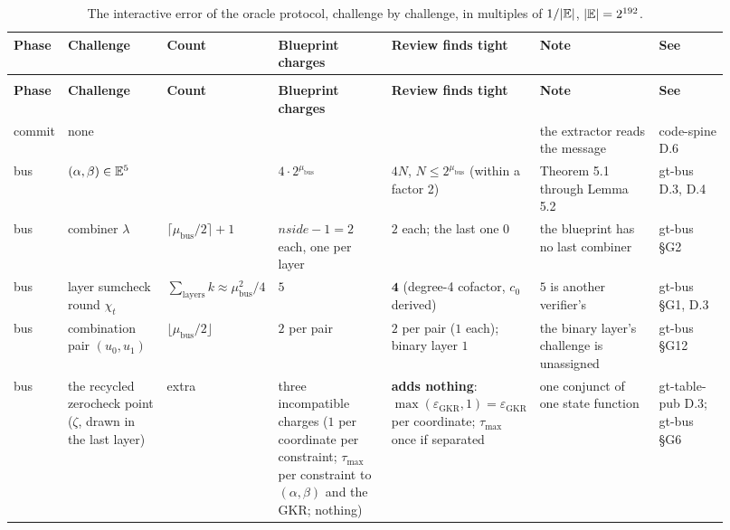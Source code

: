 \begin{landscape}
\begingroup\footnotesize\setlength{\tabcolsep}{3pt}\renewcommand{\arraystretch}{1.2}
\begin{longtable}{@{}>{\raggedright\arraybackslash}p{0.075\linewidth}>{\raggedright\arraybackslash}p{0.14\linewidth}>{\raggedright\arraybackslash}p{0.1\linewidth}>{\raggedright\arraybackslash}p{0.16\linewidth}>{\raggedright\arraybackslash}p{0.18\linewidth}>{\raggedright\arraybackslash}p{0.17\linewidth}>{\raggedright\arraybackslash}p{0.1\linewidth}@{}}
\caption{The interactive error of the oracle protocol, challenge by challenge, in multiples of $1/\lvert \mathbb{E}\rvert$, $\lvert \mathbb{E}\rvert = 2^{192}$.}\label{tab:obl-error-interactive}\\
\toprule
\textbf{Phase} & \textbf{Challenge} & \textbf{Count} & \textbf{Blueprint charges} & \textbf{Review finds tight} & \textbf{Note} & \textbf{See} \\
\midrule
\endfirsthead
\multicolumn{7}{@{}l}{\small\emph{(continued)}}\\
\toprule
\textbf{Phase} & \textbf{Challenge} & \textbf{Count} & \textbf{Blueprint charges} & \textbf{Review finds tight} & \textbf{Note} & \textbf{See} \\
\midrule
\endhead
\bottomrule
\endfoot
commit & none & 0 & 0 & 0 & the extractor reads the message & code-spine D.6 \\
\midrule
bus & $(\alpha, \beta) \in \mathbb{E}^5$ & 1 & $4\cdot 2^{\mu_{\mathrm{bus}}}$ & $4N$, $N \le 2^{\mu_{\mathrm{bus}}}$ (within a factor 2) & Theorem 5.1 through Lemma 5.2 & gt-bus D.3, D.4 \\
bus & combiner $\lambda$ & $\lceil \mu_{\mathrm{bus}}/2 \rceil + 1$ & $\mathit{nside} - 1 = 2$ each, one per layer & $2$ each; the last one $0$ & the blueprint has no last combiner & gt-bus §G2 \\
bus & layer sumcheck round $\chi_t$ & $\sum_{\text{layers}} k \approx \mu_{\mathrm{bus}}^2/4$ & $5$ & $\mathbf{4}$ (degree-4 cofactor, $c_0$ derived) & $5$ is another verifier's & gt-bus §G1, D.3 \\
bus & combination pair $(u_0, u_1)$ & $\lfloor \mu_{\mathrm{bus}}/2 \rfloor$ & $2$ per pair & $2$ per pair ($1$ each); binary layer $1$ & the binary layer's challenge is unassigned & gt-bus §G12 \\
bus & the recycled zerocheck point ($\zeta$, drawn in the last layer) & 0 extra & three incompatible charges ($1$ per coordinate per constraint; $\tau_{\max}$ per constraint to $(\alpha, \beta)$ and the GKR; nothing) & \textbf{adds nothing}: $\max(\varepsilon_{\mathrm{GKR}}, 1) = \varepsilon_{\mathrm{GKR}}$ per coordinate; $\tau_{\max}$ once if separated & one conjunct of one state function & gt-table-pub D.3; gt-bus §G6 \\

\end{longtable}
\end{landscape}
